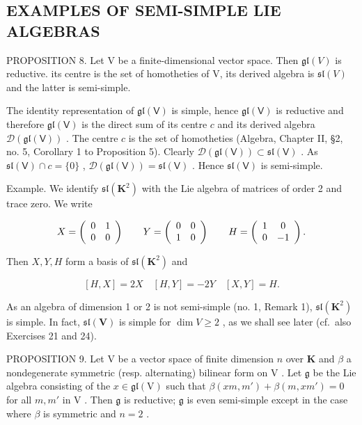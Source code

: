 \subsection{EXAMPLES OF SEMI-SIMPLE LIE ALGEBRAS}

PROPOSITION 8. Let V be a finite-dimensional vector space. Then \(\mathfrak{gl}(V)\) is reductive. its centre is the set of homotheties of V, its derived algebra is \(\mathfrak{sl}(V)\) and the latter is semi-simple.

The identity representation of \(\mathfrak{gl}(\mathsf{V})\) is simple, hence \(\mathfrak{gl}(\mathsf{V})\) is reductive and therefore \(\mathfrak{gl}(\mathsf{V})\) is the direct sum of its centre \(c\) and its derived algebra \(\mathcal{D}(\mathfrak{gl}(\mathsf{V}))\) . The centre \(c\) is the set of homotheties (Algebra, Chapter II, §2, no. 5, Corollary 1 to Proposition 5). Clearly \(\mathcal{D}(\mathfrak{gl}(\mathsf{V})) \subset \mathfrak{sl}(\mathsf{V})\) . As \(\mathfrak{sl}(\mathsf{V}) \cap c = \{0\}\) , \(\mathcal{D}(\mathfrak{gl}(\mathsf{V})) = \mathfrak{sl}(\mathsf{V})\) . Hence \(\mathfrak{sl}(\mathsf{V})\) is semi-simple.

Example. We identify \(\mathfrak{sl}(\mathbf{K}^{2})\) with the Lie algebra of matrices of order 2 and trace zero. We write

\[
X = \left( \begin{array}{c c} 0 & 1 \\ 0 & 0 \end{array} \right) \qquad Y = \left( \begin{array}{c c} 0 & 0 \\ 1 & 0 \end{array} \right) \qquad H = \left( \begin{array}{c c} 1 & 0 \\ 0 & - 1 \end{array} \right).
\]

Then \(X, Y, H\) form a basis of \(\mathfrak{sl}(\mathbf{K}^2)\) and

\[
[ H, X ] = 2 X \quad [ H, Y ] = - 2 Y \quad [ X, Y ] = H.
\]

As an algebra of dimension 1 or 2 is not semi-simple (no. 1, Remark 1), \(\mathfrak{sl}(\mathbf{K}^2)\) is simple. In fact, \(\mathfrak{sl}(\mathbf{V})\) is simple for \(\dim V \geqslant 2\) , as we shall see later (cf.~also Exercises 21 and 24).

PROPOSITION 9. Let \(\mathrm{V}\) be a vector space of finite dimension \(n\) over \(\mathbf{K}\) and \(\beta\) a nondegenerate symmetric (resp. alternating) bilinear form on \(\mathrm{V}\) . Let \(\mathfrak{g}\) be the Lie algebra consisting of the \(x \in \mathfrak{gl}(\mathrm{V})\) such that \(\beta (xm, m') + \beta (m, xm') = 0\) for all \(m, m'\) in \(\mathrm{V}\) . Then \(\mathfrak{g}\) is reductive; \(\mathfrak{g}\) is even semi-simple except in the case where \(\beta\) is symmetric and \(n = 2\) .

